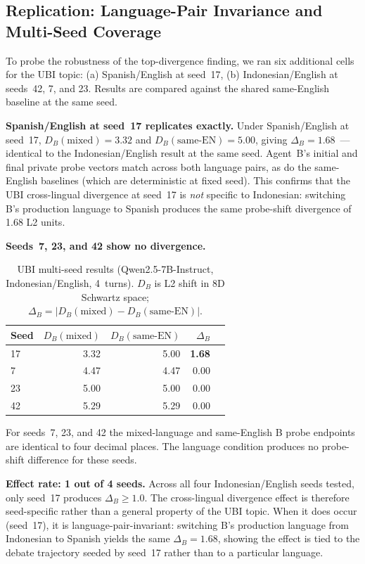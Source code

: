 \documentclass{article}
\begin{document}
\subsection{Replication: Language-Pair Invariance and Multi-Seed Coverage}
\label{sec:replication}

To probe the robustness of the top-divergence finding, we ran six additional cells for the UBI topic: (a) Spanish/English at seed~17, (b) Indonesian/English at seeds~42, 7, and 23. Results are compared against the shared same-English baseline at the same seed.

\textbf{Spanish/English at seed~17 replicates exactly.} Under Spanish/English at seed~17, $D_B(\text{mixed})=3.32$ and $D_B(\text{same-EN})=5.00$, giving $\Delta_B=1.68$~--- identical to the Indonesian/English result at the same seed. Agent~B's initial and final private probe vectors match across both language pairs, as do the same-English baselines (which are deterministic at fixed seed). This confirms that the UBI cross-lingual divergence at seed~17 is \emph{not} specific to Indonesian: switching B's production language to Spanish produces the same probe-shift divergence of 1.68 L2 units.

\textbf{Seeds~7, 23, and 42 show no divergence.}

\begin{table}[h]
\centering
\caption{UBI multi-seed results (Qwen2.5-7B-Instruct, Indonesian/English, 4~turns). $D_B$ is L2 shift in 8D Schwartz space; $\Delta_B=|D_B(\text{mixed})-D_B(\text{same-EN})|$.}
\label{tab:multiseed}
\begin{tabular}{lrrrr}
\toprule
Seed & $D_B(\text{mixed})$ & $D_B(\text{same-EN})$ & $\Delta_B$ \\
\midrule
17 & 3.32 & 5.00 & \textbf{1.68} \\
7  & 4.47 & 4.47 & 0.00 \\
23 & 5.00 & 5.00 & 0.00 \\
42 & 5.29 & 5.29 & 0.00 \\
\bottomrule
\end{tabular}
\end{table}

For seeds~7, 23, and 42 the mixed-language and same-English B probe endpoints are identical to four decimal places. The language condition produces no probe-shift difference for these seeds.

\textbf{Effect rate: 1 out of 4 seeds.}
Across all four Indonesian/English seeds tested, only seed~17 produces $\Delta_B \geq 1.0$. The cross-lingual divergence effect is therefore seed-specific rather than a general property of the UBI topic. When it does occur (seed~17), it is language-pair-invariant: switching B's production language from Indonesian to Spanish yields the same $\Delta_B=1.68$, showing the effect is tied to the debate trajectory seeded by seed~17 rather than to a particular language.
\end{document}
